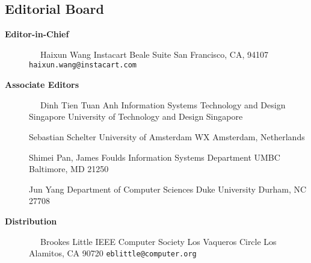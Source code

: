 \documentclass[10pt,twocolumn]{article}
\begin{document}
\pagestyle{empty}

\subsection*{Editorial Board}

\begin{description}
\item[{\bf Editor-in-Chief}]
\verb-  -                      \newline
Haixun Wang                 \newline
Instacart              Beale Suite\newline
San Francisco, CA, 94107\newline
\verb+haixun.wang@instacart.com+     \newline
\vspace{-.2cm}

\item[{\bf Associate Editors}] 
\verb-  -                     \newline
Dinh Tien Tuan Anh\newline
Information Systems Technology and Design\newline
Singapore University of Technology and Design\newline
Singapore\newline

\vspace{-.4cm}
Sebastian Schelter\newline
University of Amsterdam WX Amsterdam, Netherlands\newline

\vspace{-.4cm}
Shimei Pan, James Foulds\newline
Information Systems Department\newline 
UMBC\newline
Baltimore, MD 21250\newline

\vspace{-.4cm}
Jun Yang\newline
Department of Computer Sciences \newline 
Duke University\newline
Durham, NC 27708\newline
\vspace{-.4cm}

\item[{\bf Distribution}]      
\verb-  -                      \newline
Brookes Little           \newline
IEEE Computer Society           Los Vaqueros Circle       \newline
Los Alamitos, CA 90720     \newline
\verb+eblittle@computer.org+     \newline
\vspace{-.4cm}		            
\end{description}
\end{document}
